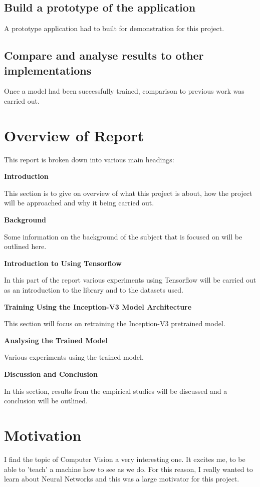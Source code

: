 \subsection*{Build a prototype of the application}
A prototype application had to built for demonstration for this project.

\subsection*{Compare and analyse results to other implementations}
Once a model had been successfully trained, comparison to previous work was carried out.

\section{Overview of Report}

This report is broken down into various main headings:

\textbf{Introduction}

This section is to give on overview of what this project is about, how the project will be approached and why it being carried out.

\textbf{Background}

Some information on the background of the subject that is focused on will be outlined here.

\textbf{Introduction to Using Tensorflow}

In this part of the report various experiments using Tensorflow will be carried out as an introduction to the library and to the datasets used.

\textbf{Training Using the Inception-V3 Model Architecture}

This section will focus on retraining the Inception-V3 pretrained model.

\textbf{Analysing the Trained Model}

Various experiments using the trained model.

\textbf{Discussion and Conclusion}

In this section, results from the empirical studies will be discussed and a conclusion will be outlined.


\section{Motivation}
I find the topic of Computer Vision a very interesting one.
It excites me, to be able to 'teach' a machine how to see as we do.
For this reason, I really wanted to learn about Neural Networks
and this was a large motivator for this project.


